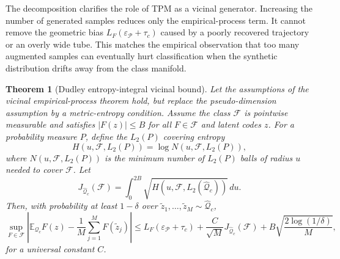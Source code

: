 \documentclass{article}
\newtheorem{theorem}{Theorem}
\begin{document}
The decomposition clarifies the role of TPM as a vicinal generator. Increasing the number of generated samples reduces only the empirical-process term. It cannot remove the geometric bias $L_F(\varepsilon_{\mathcal{P}}+\tau_c)$ caused by a poorly recovered trajectory or an overly wide tube. This matches the empirical observation that too many augmented samples can eventually hurt classification when the synthetic distribution drifts away from the class manifold.

\begin{theorem}[Dudley entropy-integral vicinal bound]
	Let the assumptions of the vicinal empirical-process theorem hold, but replace the pseudo-dimension assumption by a metric-entropy condition. Assume the class $\mathcal{F}$ is pointwise measurable and satisfies $|F(z)|\le B$ for all $F\in\mathcal{F}$ and latent codes $z$. For a probability measure $P$, define the $L_2(P)$ covering entropy
	\[
		H(u,\mathcal{F},L_2(P))=\log N(u,\mathcal{F},L_2(P)),
	\]
	where $N(u,\mathcal{F},L_2(P))$ is the minimum number of $L_2(P)$ balls of radius $u$ needed to cover $\mathcal{F}$. Let
	\[
		J_{\widehat{\mathcal{Q}}_c}(\mathcal{F})
		=
		\int_{0}^{2B}
		\sqrt{H(u,\mathcal{F},L_2(\widehat{\mathcal{Q}}_c))}\,du.
	\]
	Then, with probability at least $1-\delta$ over $\tilde z_1,\ldots,\tilde z_M\sim \widehat{\mathcal{Q}}_c$,
	\[
	\sup_{F\in\mathcal{F}}
	\left|
	\mathbb{E}_{\mathcal{Q}_c}F(z)-
	\frac{1}{M}\sum_{j=1}^{M}F(\tilde z_j)
	\right|
	\le
	L_F(\varepsilon_{\mathcal{P}}+\tau_c)
	+
	\frac{C}{\sqrt{M}}J_{\widehat{\mathcal{Q}}_c}(\mathcal{F})
	+
	B\sqrt{\frac{2\log(1/\delta)}{M}},
	\]
	for a universal constant $C$.
\end{theorem}
\end{document}
